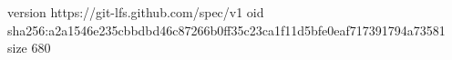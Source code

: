 version https://git-lfs.github.com/spec/v1
oid sha256:a2a1546e235cbbdbd46c87266b0ff35c23ca1f11d5bfe0eaf717391794a73581
size 680
